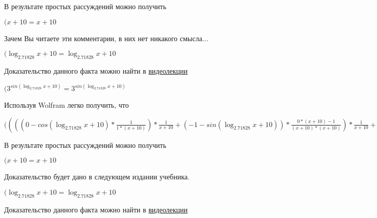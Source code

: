 \documentclass[12pt,a4paper,fleqn]{article}
\theoremstyle{definition}
\begin{document}
В результате простых рассуждений можно получить

$( x  +  10  =  x  +  10 $

Зачем Вы читаете эти комментарии, в них нет никакого смысла...

$(\log_{ 2.71828 }{ x  +  10 } = \log_{ 2.71828 }{ x  +  10 }$

Доказательство данного факта можно найти в \href{https://www.youtube.com/watch?v=dQw4w9WgXcQ}{видеолекции}

$({ 3 }^{sin(\log_{ 2.71828 }{ x  +  10 })} = { 3 }^{sin(\log_{ 2.71828 }{ x  +  10 })}$

Используя Wolfram легко получить, что

$(((( 0  - cos(\log_{ 2.71828 }{ x  +  10 }) * \frac{ 1 }{ 1  * ( x  +  10 )}
) * \frac{ 1 }{ x  +  10 }
 + ( -1  - sin(\log_{ 2.71828 }{ x  +  10 })) * \frac{ 0  * ( x  +  10 ) -  1 }{( x  +  10 ) * ( x  +  10 )}
) * \frac{ 1 }{ x  +  10 }
 + ( -1  - sin(\log_{ 2.71828 }{ x  +  10 })) * \frac{ 1 }{ x  +  10 }
 * \frac{ 0  * ( x  +  10 ) -  1 }{( x  +  10 ) * ( x  +  10 )}
 + ( -1  - sin(\log_{ 2.71828 }{ x  +  10 })) * \frac{ 1 }{ 1  * ( x  +  10 )}
 * \frac{ -2 }{( x  +  10 ) * ( x  +  10 )}
 + cos(\log_{ 2.71828 }{ x  +  10 }) * \frac{ 0  * ( x  +  10 ) * ( x  +  10 ) -  -2  * ( 1  * ( x  +  10 ) + ( x  +  10 ) *  1 )}{( x  +  10 ) * ( x  +  10 ) * ( x  +  10 ) * ( x  +  10 )}
) * { 3 }^{sin(\log_{ 2.71828 }{ x  +  10 })} = ((( 0  - cos(\log_{ 2.71828 }{ x  +  10 }) * \frac{ 1 }{ 1  * ( x  +  10 )}
) * \frac{ 1 }{ x  +  10 }
 + ( -1  - sin(\log_{ 2.71828 }{ x  +  10 })) * \frac{ 0  * ( x  +  10 ) -  1 }{( x  +  10 ) * ( x  +  10 )}
) * \frac{ 1 }{ x  +  10 }
 + ( -1  - sin(\log_{ 2.71828 }{ x  +  10 })) * \frac{ 1 }{ x  +  10 }
 * \frac{ 0  * ( x  +  10 ) -  1 }{( x  +  10 ) * ( x  +  10 )}
 + ( -1  - sin(\log_{ 2.71828 }{ x  +  10 })) * \frac{ 1 }{ 1  * ( x  +  10 )}
 * \frac{ -2 }{( x  +  10 ) * ( x  +  10 )}
 + cos(\log_{ 2.71828 }{ x  +  10 }) * \frac{ 0  * ( x  +  10 ) * ( x  +  10 ) -  -2  * ( 1  * ( x  +  10 ) + ( x  +  10 ) *  1 )}{( x  +  10 ) * ( x  +  10 ) * ( x  +  10 ) * ( x  +  10 )}
) * { 3 }^{sin(\log_{ 2.71828 }{ x  +  10 })}$

В результате простых рассуждений можно получить

$( x  +  10  =  x  +  10 $

Доказательство будет дано в следующем издании учебника.

$(\log_{ 2.71828 }{ x  +  10 } = \log_{ 2.71828 }{ x  +  10 }$

Доказательство данного факта можно найти в \href{https://www.youtube.com/watch?v=dQw4w9WgXcQ}{видеолекции}
\end{document}

